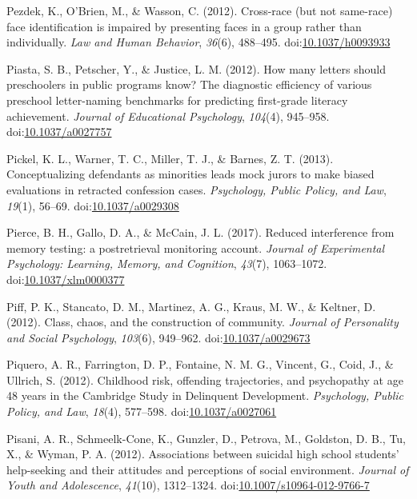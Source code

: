 \documentclass[english,man]{apa6}
\theoremstyle{definition}
\theoremstyle{definition}
\theoremstyle{definition}
\theoremstyle{remark}
\begin{document}
\hypertarget{ref-Pezdek2012}{}
Pezdek, K., O'Brien, M., \& Wasson, C. (2012). Cross-race (but not
same-race) face identification is impaired by presenting faces in a
group rather than individually. \emph{Law and Human Behavior},
\emph{36}(6), 488--495.
doi:\href{https://doi.org/10.1037/h0093933}{10.1037/h0093933}

\hypertarget{ref-Piasta2012}{}
Piasta, S. B., Petscher, Y., \& Justice, L. M. (2012). How many letters
should preschoolers in public programs know? The diagnostic efficiency
of various preschool letter-naming benchmarks for predicting first-grade
literacy achievement. \emph{Journal of Educational Psychology},
\emph{104}(4), 945--958.
doi:\href{https://doi.org/10.1037/a0027757}{10.1037/a0027757}

\hypertarget{ref-Pickel2013}{}
Pickel, K. L., Warner, T. C., Miller, T. J., \& Barnes, Z. T. (2013).
Conceptualizing defendants as minorities leads mock jurors to make
biased evaluations in retracted confession cases. \emph{Psychology,
Public Policy, and Law}, \emph{19}(1), 56--69.
doi:\href{https://doi.org/10.1037/a0029308}{10.1037/a0029308}

\hypertarget{ref-Pierce2017}{}
Pierce, B. H., Gallo, D. A., \& McCain, J. L. (2017). Reduced
interference from memory testing: a postretrieval monitoring account.
\emph{Journal of Experimental Psychology: Learning, Memory, and
Cognition}, \emph{43}(7), 1063--1072.
doi:\href{https://doi.org/10.1037/xlm0000377}{10.1037/xlm0000377}

\hypertarget{ref-Piff2012}{}
Piff, P. K., Stancato, D. M., Martinez, A. G., Kraus, M. W., \& Keltner,
D. (2012). Class, chaos, and the construction of community.
\emph{Journal of Personality and Social Psychology}, \emph{103}(6),
949--962. doi:\href{https://doi.org/10.1037/a0029673}{10.1037/a0029673}

\hypertarget{ref-Piquero2012}{}
Piquero, A. R., Farrington, D. P., Fontaine, N. M. G., Vincent, G.,
Coid, J., \& Ullrich, S. (2012). Childhood risk, offending trajectories,
and psychopathy at age 48 years in the Cambridge Study in Delinquent
Development. \emph{Psychology, Public Policy, and Law}, \emph{18}(4),
577--598. doi:\href{https://doi.org/10.1037/a0027061}{10.1037/a0027061}

\hypertarget{ref-Pisani2012}{}
Pisani, A. R., Schmeelk-Cone, K., Gunzler, D., Petrova, M., Goldston, D.
B., Tu, X., \& Wyman, P. A. (2012). Associations between suicidal high
school students' help-seeking and their attitudes and perceptions of
social environment. \emph{Journal of Youth and Adolescence},
\emph{41}(10), 1312--1324.
doi:\href{https://doi.org/10.1007/s10964-012-9766-7}{10.1007/s10964-012-9766-7}
\end{document}
